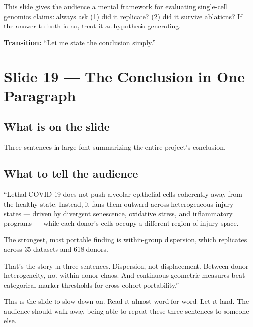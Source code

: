 \documentclass[11pt]{article}
\begin{document}
\begin{whyblock}
This slide gives the audience a mental framework for evaluating single-cell genomics claims: always ask (1) did it replicate? (2) did it survive ablations? If the answer to both is no, treat it as hypothesis-generating.
\end{whyblock}

\textbf{Transition:} ``Let me state the conclusion simply.''


\section{Slide 19 --- The Conclusion in One Paragraph}

\subsection{What is on the slide}

Three sentences in large font summarizing the entire project's conclusion.

\subsection{What to tell the audience}

\begin{speaknote}
``Lethal COVID-19 does not push alveolar epithelial cells coherently away from the healthy state. Instead, it fans them outward across heterogeneous injury states --- driven by divergent senescence, oxidative stress, and inflammatory programs --- while each donor's cells occupy a different region of injury space.

The strongest, most portable finding is within-group dispersion, which replicates across 35 datasets and 618 donors.

That's the story in three sentences. Dispersion, not displacement. Between-donor heterogeneity, not within-donor chaos. And continuous geometric measures beat categorical marker thresholds for cross-cohort portability.''
\end{speaknote}

\begin{resultbox}
This is the slide to slow down on. Read it almost word for word. Let it land. The audience should walk away being able to repeat these three sentences to someone else.
\end{resultbox}
\end{document}
